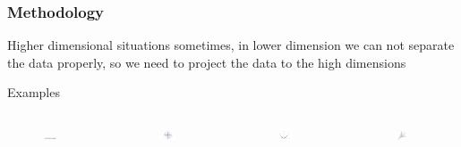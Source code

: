 \documentclass{beamer}
\begin{document}
\begin{frame}
\frametitle{Methodology}
\begin{block}{Higher dimensional situations}
sometimes, in lower dimension we can not separate the data properly, so we need to project the data to the high dimensions\\
\end{block}
\begin{block}{Examples}
\begin{columns}
\column{2.3in}
\begin{figure}
     \includegraphics[width=0.5\textwidth, height=0.1\textheight]{1d.png}
\end{figure}
\begin{figure}
     \includegraphics[width=0.5\textwidth, height=0.3\textheight]{2d.png}
\end{figure}

\column{2.3in}
\begin{figure}
     \includegraphics[width=0.5\textwidth, height=0.2\textheight]{1d_2.png}
\end{figure}
\begin{figure}
     \includegraphics[width=0.5\textwidth, height=0.2\textheight]{2d_2.png}
\end{figure}
\end{columns}
\end{block}
\end{frame}
\end{document}
